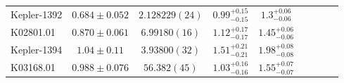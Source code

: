 \documentclass[a4paper,fleqn,usenatbib]{mnras}
\begin{document}
\begin{table*}
\begin{tabular}{lcccccccc}
Kepler-1392&$0.684 \pm 0.052$	&$ 2.128229 (24)$	    &$0.99^{+0.15}_{-0.15}$	&$1.3^{+0.06}_{-0.06}$	&\\
K02801.01&	$0.870 \pm 0.061$	&$ 6.99180 (16)$	  &$1.12^{+0.17}_{-0.17}$	&$1.45^{+0.06}_{-0.06}$	&\\
Kepler-1394&$1.04 \pm 0.11$ 	&$ 3.93800 (32)$	  &$1.51^{+0.21}_{-0.21}$	&$1.98^{+0.08}_{-0.08}$	&\\
K03168.01&	$0.988 \pm 0.076$	&$56.382 (45)$         &$1.03^{+0.16}_{-0.16}$	&$1.55^{+0.07}_{-0.07}$	&\\
\end{tabular}
\end{table*}
\end{document}
